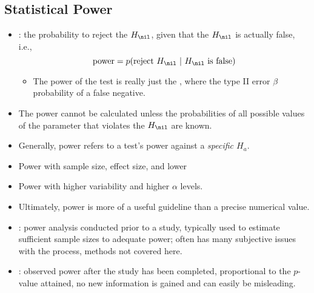\begin{itemize}
  \subsection{Statistical Power}
  \begin{itemize}
    \item {}: the probability to reject the \(H_\nil\), given that the \(H_\nil\) is actually false, i.e.,
    \[%
    \text{power} = p(\text{reject}~H_\nil~|~H_\nil~\text{is false})
    \]%
    \begin{itemize}
      \item The power of the test is really just the \hyperref[Subsection: Statistical Errors]{}, where the type II error \(\beta\) probability of a false negative.
    \end{itemize}
    \item The power cannot be calculated unless the probabilities of all possible values of the parameter that violates the \(H_\nil\) are known.
    \item Generally, power refers to a test's power against a \emph{specific \(H_a\)}.
    \item Power  with sample size, effect size, and lower \hyperref[Subsection: P-Value]{} 
    \item Power  with higher variability and higher \(\alpha \) levels. 
    \item Ultimately, power is more of a useful guideline than a precise numerical value.
    \item {}: power analysis conducted prior to a study, typically used to estimate sufficient sample sizes to adequate power; often has many subjective issues with the process, methods not covered here.
    \item {}: observed power after the study has been completed, proportional to the \(p\)-value attained, no new information is gained and can easily be misleading.
  \end{itemize}
    
\end{itemize}

